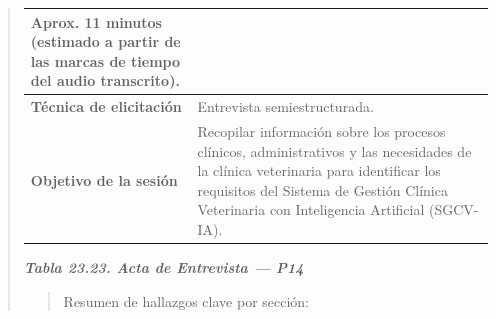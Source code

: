 \documentclass[
]{article}
\begin{document}
\begin{quote}
{\begin{longtable}[]{|
  >{\raggedright\arraybackslash}p{}|
  >{\raggedright\arraybackslash}p{}|}
\begin{minipage}[t]{\linewidth}
Aprox. 11 minutos (estimado a partir de las marcas de tiempo del audio transcrito).
\end{minipage} \\
\hline
\textbf{Técnica de elicitación} & \begin{minipage}[t]{\linewidth}\raggedright
Entrevista semiestructurada.
\end{minipage} \\
\hline
\textbf{Objetivo de la sesión} & \begin{minipage}[t]{\linewidth}\raggedright
Recopilar información sobre los procesos clínicos, administrativos y las necesidades de la clínica veterinaria para identificar los requisitos del Sistema de Gestión Clínica Veterinaria con Inteligencia Artificial (SGCV-IA).
\end{minipage} \\
\hline
\end{longtable}
}

\protect{}\label{_bookmark_P14_acta}{}\emph{\textbf{Tabla 23.23. Acta de Entrevista --- P14}}

\begin{quote}
Resumen de hallazgos clave por sección:
\end{quote}


\end{quote}
\end{document}
